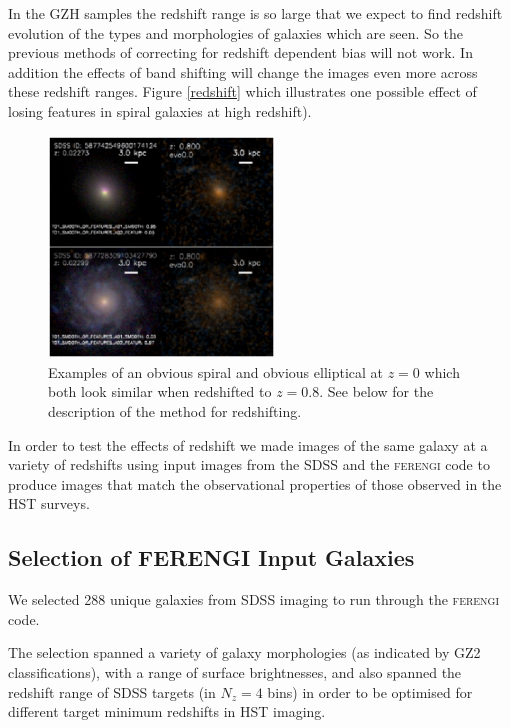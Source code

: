 \documentclass[usenatbib]{mn2e}
\newcommand{\ferengi}{\textsc{ferengi}}
\begin{document}
In the GZH samples the redshift range is so large that we expect to find redshift evolution of the types and morphologies of galaxies which are seen. So the previous methods of correcting for redshift dependent bias will not work. In addition the effects of band shifting will change the images even more across these redshift ranges. Figure \ref{redshift} which illustrates one possible effect of losing features in spiral galaxies at high redshift). 

\begin{figure}
\begin{center}
\includegraphics[width=60mm]{example_ferengi2.ps}
\caption{Examples of an obvious spiral and obvious elliptical at $z=0$ which both look similar when redshifted to $z=0.8$. See below for the description of the method for redshifting.\label{exampleFERENGI}}
\end{center}
\end{figure}

In order to test the effects of redshift we made images of the same galaxy at a variety of redshifts using input images from the SDSS \citep{yor00,str02} and the \ferengi{} code \citep{bar08a} to produce images that match the observational properties of those observed in the HST surveys. 
 
\subsection{Selection of FERENGI Input Galaxies}

We selected 288 unique galaxies from SDSS imaging to run through the \ferengi{} code.

The selection spanned a variety of galaxy morphologies (as indicated by GZ2 classifications), with a range of surface brightnesses, and also spanned the redshift range of SDSS targets (in $N_z = 4$ bins) in order to be optimised for different target minimum redshifts in HST imaging. 
\end{document}
